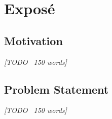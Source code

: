 \clearpage

\chapter{Expos\'e}

\section*{Motivation}
\textit{[TODO ~150 words]}

\section*{Problem Statement}
\textit{[TODO ~150 words]}

